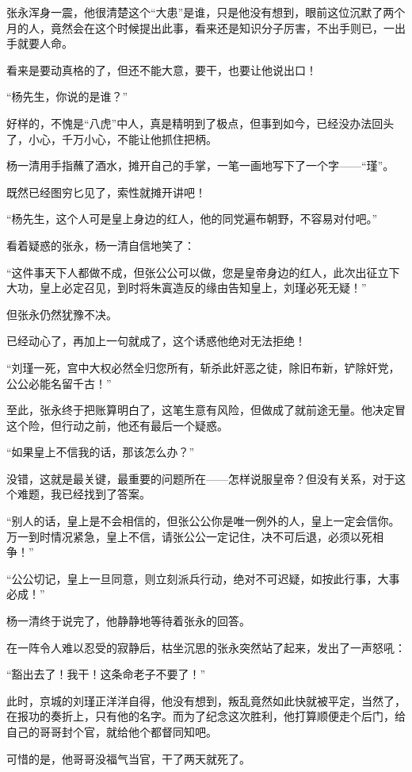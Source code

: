 \begin{multicols}{\theparacolNo}
张永浑身一震，他很清楚这个“大患”是谁，只是他没有想到，眼前这位沉默了两个月的人，竟然会在这个时候提出此事，看来还是知识分子厉害，不出手则已，一出手就要人命。

看来是要动真格的了，但还不能大意，要干，也要让他说出口！

“杨先生，你说的是谁？”

好样的，不愧是“八虎”中人，真是精明到了极点，但事到如今，已经没办法回头了，小心，千万小心，不能让他抓住把柄。

杨一清用手指蘸了酒水，摊开自己的手掌，一笔一画地写下了一个字——“瑾”。

既然已经图穷匕见了，索性就摊开讲吧！

“杨先生，这个人可是皇上身边的红人，他的同党遍布朝野，不容易对付吧。”

看着疑惑的张永，杨一清自信地笑了：

“这件事天下人都做不成，但张公公可以做，您是皇帝身边的红人，此次出征立下大功，皇上必定召见，到时将朱寘造反的缘由告知皇上，刘瑾必死无疑！”

但张永仍然犹豫不决。

已经动心了，再加上一句就成了，这个诱惑他绝对无法拒绝！

“刘瑾一死，宫中大权必然全归您所有，斩杀此奸恶之徒，除旧布新，铲除奸党，公公必能名留千古！”

至此，张永终于把账算明白了，这笔生意有风险，但做成了就前途无量。他决定冒这个险，但行动之前，他还有最后一个疑惑。

“如果皇上不信我的话，那该怎么办？”

没错，这就是最关键，最重要的问题所在——怎样说服皇帝？但没有关系，对于这个难题，我已经找到了答案。

“别人的话，皇上是不会相信的，但张公公你是唯一例外的人，皇上一定会信你。万一到时情况紧急，皇上不信，请张公公一定记住，决不可后退，必须以死相争！”

“公公切记，皇上一旦同意，则立刻派兵行动，绝对不可迟疑，如按此行事，大事必成！”

杨一清终于说完了，他静静地等待着张永的回答。

在一阵令人难以忍受的寂静后，枯坐沉思的张永突然站了起来，发出了一声怒吼：

“豁出去了！我干！这条命老子不要了！”

此时，京城的刘瑾正洋洋自得，他没有想到，叛乱竟然如此快就被平定，当然了，在报功的奏折上，只有他的名字。而为了纪念这次胜利，他打算顺便走个后门，给自己的哥哥封个官，就给他个都督同知吧。

可惜的是，他哥哥没福气当官，干了两天就死了。


\end{multicols}
